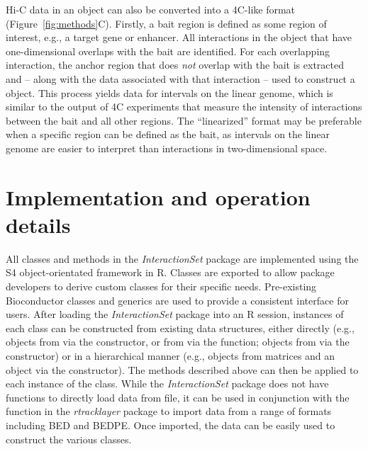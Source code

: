 \documentclass[10pt,a4paper,twocolumn]{article}
\begin{document}
Hi-C data in an  object can also be converted into a 4C-like format (Figure~\ref{fig:methods}C).
Firstly, a bait region is defined as some region of interest, e.g., a target gene or enhancer.
All interactions in the  object that have one-dimensional overlaps with the bait are identified.
For each overlapping interaction, the anchor region that does \textit{not} overlap with the bait is extracted and -- along with the data associated with that interaction -- used to construct a  object.
This process yields data for intervals on the linear genome, which is similar to the output of 4C experiments \cite{simonis2006nuclear} that measure the intensity of interactions between the bait and all other regions.
The ``linearized'' format may be preferable when a specific region can be defined as the bait, as intervals on the linear genome are easier to interpret than interactions in two-dimensional space.

\section*{Implementation and operation details}
All classes and methods in the \textit{InteractionSet} package are implemented using the S4 object-orientated framework in R.
Classes are exported to allow package developers to derive custom classes for their specific needs.
Pre-existing Bioconductor classes and generics are used to provide a consistent interface for users.
After loading the \textit{InteractionSet} package into an R session, instances of each class can be constructed from existing data structures, either directly (e.g.,  objects from  via the  constructor, or from  via the  function;  objects from  via the  constructor) or in a hierarchical manner (e.g.,  objects from matrices and an  object via the  constructor).
The methods described above can then be applied to each instance of the class.
While the \textit{InteractionSet} package does not have functions to directly load data from file, it can be used in conjunction with the  function in the \textit{rtracklayer} package \cite{lawrence2009rtracklayer} to import data from a range of formats including BED and BEDPE.
Once imported, the data can be easily used to construct the various classes.
\end{document}
